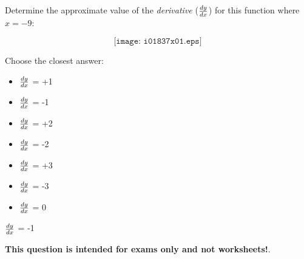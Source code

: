 

Determine the approximate value of the {\it derivative} ($dy \over dx$) for this function where $x=-9$:

$$\texttt{[image: i01837x01.eps]}$$

Choose the closest answer:

\begin{itemize}
\item{} $dy \over dx$ = +1
\vskip 10pt 
\item{} $dy \over dx$ = -1
\vskip 10pt 
\item{} $dy \over dx$ = +2
\vskip 10pt 
\item{} $dy \over dx$ = -2
\vskip 10pt 
\item{} $dy \over dx$ = +3
\vskip 10pt 
\item{} $dy \over dx$ = -3
\vskip 10pt 
\item{} $dy \over dx$ = 0
\end{itemize}







$dy \over dx$ = -1







{\bf This question is intended for exams only and not worksheets!}.



